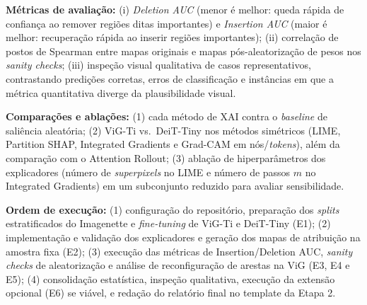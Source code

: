 \documentclass{article}
\begin{document}
\textbf{Métricas de avaliação:} (i) \textit{Deletion AUC} (menor é melhor: queda rápida de confiança ao remover regiões ditas importantes) e \textit{Insertion AUC} (maior é melhor: recuperação rápida ao inserir regiões importantes); (ii) correlação de postos de Spearman entre mapas originais e mapas pós-aleatorização de pesos nos \textit{sanity checks}; (iii) inspeção visual qualitativa de casos representativos, contrastando predições corretas, erros de classificação e instâncias em que a métrica quantitativa diverge da plausibilidade visual.

\textbf{Comparações e ablações:} (1) cada método de XAI contra o \textit{baseline} de saliência aleatória; (2) ViG-Ti vs.\ DeiT-Tiny nos métodos simétricos (LIME, Partition SHAP, Integrated Gradients e Grad-CAM em nós/\textit{tokens}), além da comparação com o Attention Rollout; (3) ablação de hiperparâmetros dos explicadores (número de \textit{superpixels} no LIME e número de passos $m$ no Integrated Gradients) em um subconjunto reduzido para avaliar sensibilidade.

\textbf{Ordem de execução:} (1) configuração do repositório, preparação dos \textit{splits} estratificados do Imagenette e \textit{fine-tuning} de ViG-Ti e DeiT-Tiny (E1); (2) implementação e validação dos explicadores e geração dos mapas de atribuição na amostra fixa (E2); (3) execução das métricas de Insertion/Deletion AUC, \textit{sanity checks} de aleatorização e análise de reconfiguração de arestas na ViG (E3, E4 e E5); (4) consolidação estatística, inspeção qualitativa, execução da extensão opcional (E6) se viável, e redação do relatório final no template da Etapa 2.



\end{document}
